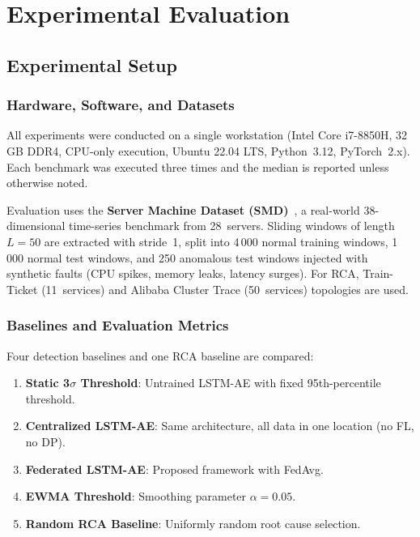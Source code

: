 \chapter{Experimental Evaluation}
\label{ch:evaluation}

\section{Experimental Setup}
\label{sec:eval_setup}

\subsection{Hardware, Software, and Datasets}
\label{subsec:eval_hardware}

All experiments were conducted on a single workstation (Intel Core i7-8850H,
32\,GB DDR4, CPU-only execution, Ubuntu 22.04 LTS, Python~3.12, PyTorch~2.x).
Each benchmark was executed three times and the median is reported unless
otherwise noted.

Evaluation uses the \textbf{Server Machine Dataset (SMD)}~\cite{su2019robust},
a real-world 38-dimensional time-series benchmark from 28~servers. Sliding
windows of length $L=50$ are extracted with stride~1, split into 4\,000
normal training windows, 1\,000 normal test windows, and 250 anomalous test
windows injected with synthetic faults (CPU spikes, memory leaks, latency
surges). For RCA, Train-Ticket (11~services) and Alibaba Cluster Trace
(50~services) topologies are used.

\subsection{Baselines and Evaluation Metrics}
\label{subsec:eval_baselines}

Four detection baselines and one RCA baseline are compared:

\begin{enumerate}
    \item \textbf{Static 3$\sigma$ Threshold}: Untrained LSTM-AE with fixed
    95th-percentile threshold.
    \item \textbf{Centralized LSTM-AE}: Same architecture, all data in one
    location (no FL, no DP).
    \item \textbf{Federated LSTM-AE}: Proposed framework with FedAvg.
    \item \textbf{EWMA Threshold}: Smoothing parameter $\alpha = 0.05$.
    \item \textbf{Random RCA Baseline}: Uniformly random root cause selection.
\end{enumerate}

